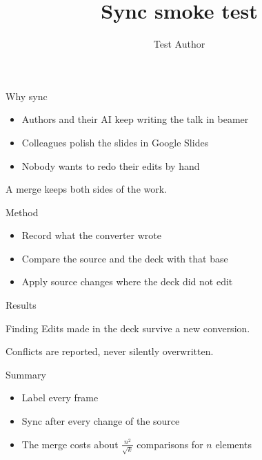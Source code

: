 \documentclass{beamer}
\title{Sync smoke test}
\author{Test Author}
\begin{document}
\begin{frame}[label=intro]{Why sync}
  \begin{itemize}
    \item Authors and their AI keep writing the talk in beamer
    \item Colleagues polish the slides in Google Slides
    \item Nobody wants to redo their edits by hand
  \end{itemize}
  \vspace{1em}
  A merge keeps both sides of the work.
\end{frame}

\begin{frame}[label=method]{Method}
  \begin{itemize}
    \item Record what the converter wrote
    \item Compare the source and the deck with that base
    \item Apply source changes where the deck did not edit
  \end{itemize}
\end{frame}

\begin{frame}[label=results]{Results}
  \begin{block}{Finding}
    Edits made in the deck survive a new conversion.
  \end{block}
  \vspace{1em}
  Conflicts are reported, never silently overwritten.
\end{frame}

\begin{frame}[label=end]{Summary}
  \begin{itemize}
    \item Label every frame
    \item Sync after every change of the source
    \item The merge costs about $\frac{n^2}{\sqrt{k}}$ comparisons for $n$ elements
  \end{itemize}
\end{frame}
\end{document}
